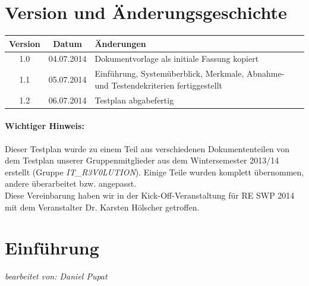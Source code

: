 \documentclass[fontsize=12pt,paper=a4,twoside]{scrartcl}
\begin{document}


\newpage

  \thispagestyle{fancy}
  \fancyhead{}
  \fancyfoot{}
  \renewcommand{\headrulewidth}{0.4pt}
  \tableofcontents

\newpage



\section*{Version und Änderungsgeschichte}

\begin{tabular}{ccl}
Version & Datum & Änderungen \\
\hline
1.0 & 04.07.2014 & Dokumentvorlage als initiale Fassung kopiert \\
1.1 & 05.07.2014 & Einführung, Systemüberblick, Merkmale, Abnahme- und Testendekriterien fertiggestellt\\
1.2 & 06.07.2014 & Testplan abgabefertig
\end{tabular}

\paragraph{Wichtiger Hinweis:} Dieser Testplan wurde zu einem Teil aus verschiedenen Dokumententeilen von dem Testplan unserer Gruppenmitglieder aus dem Wintersemester 2013/14 erstellt (Gruppe \textit{IT\_R3V0LUTION}). Einige Teile wurden komplett übernommen, andere überarbeitet bzw. angepasst. \\
Diese Vereinbarung haben wir in der Kick-Off-Veranstaltung für RE SWP 2014 mit dem Veranstalter Dr. Karsten Hölscher getroffen. \\

\section{Einführung}\label{c01}
\textit{bearbeitet von: Daniel Pupat }
\end{document}
